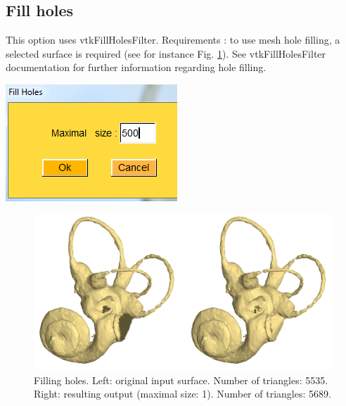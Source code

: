 \subsection{Fill holes}

\noindent
\begin{minipage}{0.5\textwidth}

This option uses vtkFillHolesFilter.
Requirements : to use mesh hole filling, a selected surface is
required (see for instance Fig. \ref{fill_holes}). See vtkFillHolesFilter documentation for further
information regarding hole filling.


\end{minipage}    
\begin{minipage}{0.5\textwidth}\centering
  \includegraphics[scale=0.5]{images/Edit_selected_objects/09_fill_holes.png}
 \end{minipage} 
\noindent

\begin{figure}
  \centering
  \includegraphics[scale=0.25]{images/Edit_selected_objects/09_fill_holes_input_output.png} 
	\caption{Filling holes. Left: original input surface. Number of triangles: 5535. Right: resulting output (maximal size: 1). Number of triangles: 5689.}
\label{fill_holes}
 
\end{figure}



